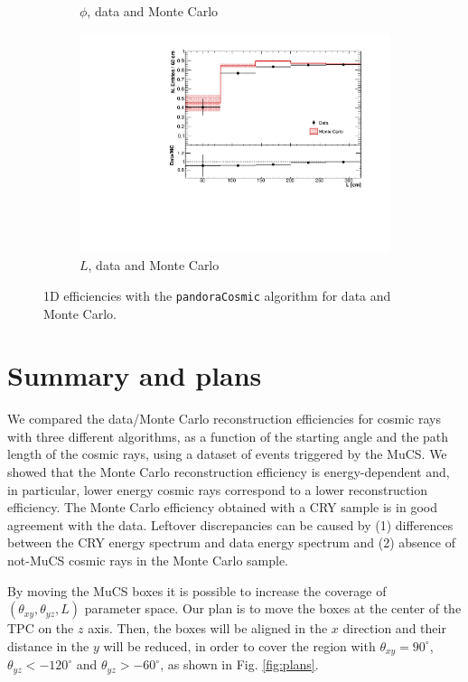 \documentclass[a4paper]{scrartcl}
\begin{document}
\begin{figure}[htbp]
\begin{center}
\begin{subfigure}{0.52\textwidth}
\caption{$\phi$, data and Monte Carlo}\label{fig:1d_cry_mc}
\end{subfigure}
\begin{subfigure}{0.52\textwidth}
\includegraphics[width=\linewidth]{l_cry.pdf}
\caption{$L$, data and Monte Carlo}\label{fig:1d_cry_ratio}
\end{subfigure}
\caption{1D efficiencies with the \texttt{pandoraCosmic} algorithm for data and Monte Carlo.} \label{fig:cry_mc_1d}
\end{center}
\end{figure}

\clearpage{}

\section{Summary and plans}
We compared the data/Monte Carlo reconstruction efficiencies for cosmic rays  with three different algorithms, as a function of the starting angle and the path length of the cosmic rays, using a dataset of events triggered by the MuCS. We showed that the Monte Carlo reconstruction efficiency is energy-dependent and, in particular, lower energy cosmic rays correspond to a lower reconstruction efficiency. The Monte Carlo efficiency obtained with a CRY sample is in good agreement with the data.  Leftover discrepancies can be caused by (1) differences between the CRY energy spectrum and data energy spectrum and (2) absence of not-MuCS cosmic rays in the Monte Carlo sample. 

By moving the MuCS boxes it is possible to increase the coverage of $(\theta_{xy}, \theta_{yz}, L)$ parameter space.
Our plan is to move the boxes at the center of the TPC on the $z$ axis. Then, the boxes will be aligned in the $x$ direction and their distance in the $y$ will be reduced, in order to cover the region with $\theta_{xy} = 90^{\circ}$, $\theta_{yz} < -120^{\circ}$ and $\theta_{yz} > -60^{\circ}$, as shown in Fig. \ref{fig:plans}.
\end{document}
